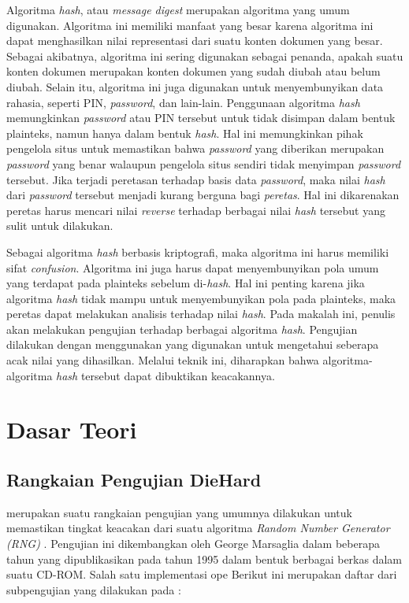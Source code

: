 \documentclass[conference]{IEEEtran}
\newcommand{\en}[1]
    {\foreignlanguage{english}{\textit{#1}}}
\begin{document}
Algoritma \en{hash}, atau \en{message digest} merupakan algoritma yang umum digunakan.
Algoritma ini memiliki manfaat yang besar karena algoritma ini dapat menghasilkan nilai representasi dari suatu konten dokumen yang besar.
Sebagai akibatnya, algoritma ini sering digunakan sebagai penanda, apakah suatu konten dokumen merupakan konten dokumen yang sudah diubah atau belum diubah.
Selain itu, algoritma ini juga digunakan untuk menyembunyikan data rahasia, seperti PIN, \en{password}, dan lain-lain.
Penggunaan algoritma \en{hash} memungkinkan \en{password} atau PIN tersebut untuk tidak disimpan dalam bentuk plainteks, namun hanya dalam bentuk \en{hash}.
Hal ini memungkinkan pihak pengelola situs untuk memastikan bahwa \en{password} yang diberikan merupakan \en{password} yang benar walaupun pengelola situs sendiri tidak menyimpan \en{password} tersebut.
Jika terjadi peretasan terhadap basis data \en{password}, maka nilai \en{hash} dari \en{password} tersebut menjadi kurang berguna bagi \en{peretas}.
Hal ini dikarenakan peretas harus mencari nilai \en{reverse} terhadap berbagai nilai \en{hash} tersebut yang sulit untuk dilakukan.

Sebagai algoritma \en{hash} berbasis kriptografi, maka algoritma ini harus memiliki sifat \en{confusion}.
Algoritma ini juga harus dapat menyembunyikan pola umum yang terdapat pada plainteks sebelum di-\en{hash}.
Hal ini penting karena jika algoritma \en{hash} tidak mampu untuk menyembunyikan pola pada plainteks, maka peretas dapat melakukan analisis terhadap nilai \en{hash}.
Pada makalah ini, penulis akan melakukan pengujian terhadap berbagai algoritma \en{hash}.
Pengujian dilakukan dengan menggunakan  yang digunakan untuk mengetahui seberapa acak nilai yang dihasilkan.
Melalui teknik ini, diharapkan bahwa algoritma-algoritma \en{hash} tersebut dapat dibuktikan keacakannya.

\section{Dasar Teori}
\label{sec:teori}

\subsection{Rangkaian Pengujian DieHard}
\label{sec:teori:diehard}

 merupakan suatu rangkaian pengujian yang umumnya dilakukan untuk memastikan tingkat keacakan dari suatu algoritma \en{Random Number Generator (RNG)} \cite{alani2010testing}.
Pengujian ini dikembangkan oleh George Marsaglia dalam beberapa tahun yang dipublikasikan pada tahun 1995 dalam bentuk berbagai berkas dalam suatu CD-ROM. \cite{marsaglia1998diehard}
Salah satu implementasi ope
Berikut ini merupakan daftar dari subpengujian yang dilakukan pada  \cite{brown2013dieharder}:
\end{document}
